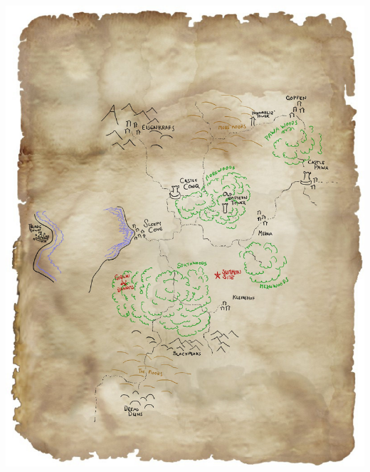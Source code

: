 \documentclass[11pt, twoside, titlepage, a4paper]{report}
\begin{document}
\begin{center}
\vspace{1 cm} %
\includegraphics[width=1.0\linewidth]{./maps/region-gm.jpg}
\end{center}








\end{document}
